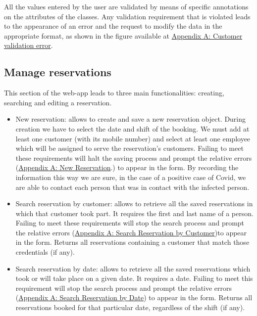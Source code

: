 \documentclass{article}
\begin{document}
All the values entered by the user are validated by means of specific annotations on the attributes of the classes. Any validation requirement that is violated leads to the appearance of an error and the request to modify the data in the appropriate format, as shown in the figure available at \hyperref[fig:customer_validation_error]{Appendix A: Customer validation error}.

\subsection*{Manage reservations}
This section of the web-app leads to three main functionalities: creating, searching
and editing a reservation.

\begin{itemize}
  \item New reservation: allows to create and save a new reservation object.
  		During creation we have to select the date and shift of the booking.
  		We must add at least one customer (with its mobile
  		number) and select at least one employee which will be assigned to serve 
  		the reservation's customers. 
  		Failing to meet these requirements will halt the saving 
  		process and prompt the relative errors  
  		(\hyperref[sec:new_reservation_form_errors]{Appendix A: New Reservation}.)
  		 to appear in the form.
  		By recording the information this way we are sure, in the case of 
  		a positive case of Covid, we are able to contact each person that 
  		was in contact with the infected person.
  

   \item Search reservation by customer: allows to retrieve all the saved 
   		reservations in which that customer took part.
   		It requires the first and last name of a person.
   		Failing to meet these requirements will stop the search process 
   		and prompt the relative errors
   		 (\hyperref[sec:search_reservation_by_customer_errors]
   		{Appendix A: Search Reservation by Customer})to appear in the form.
   		Returns all reservations containing a customer that match
   		those credentials (if any).
   
   \item Search reservation by date: allows to retrieve all the saved reservations
   		which took or will take place on a given date.
		It requires a date. Failing to meet this requirement will stop the search
		process and prompt the relative errors
		(\hyperref[sec:search_reservation_by_date_errors]{Appendix A: Search Reservation
		 by Date}) to appear in the form.   		
   		Returns all reservations booked for that particular date, 
   		regardless of the shift (if any).		 
   	

\end{itemize}
\end{document}

